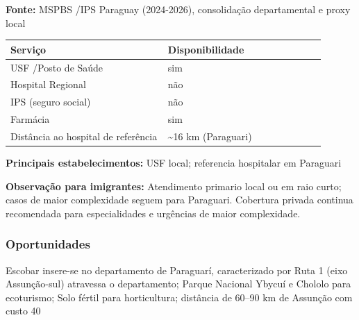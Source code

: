 \textbf{Fonte:} MSPBS /\allowbreak  IPS Paraguay (2024-2026), consolidação
departamental e proxy local

{\def\LTcaptype{none} %
\begin{longtable}{@{}>{\raggedright\arraybackslash}p{0.45\linewidth} >{\raggedright\arraybackslash}p{0.45\linewidth}@{}}
\toprule\noalign{}
Serviço & Disponibilidade \\
\midrule\noalign{}
\endhead
\bottomrule\noalign{}
\endlastfoot
USF /\allowbreak  Posto de Saúde & sim \\
Hospital Regional & não \\
IPS (seguro social) & não \\
Farmácia & sim \\
Distância ao hospital de referência & \textasciitilde16 km
(Paraguari) \\
\end{longtable}
}

\textbf{Principais estabelecimentos:} USF local; referencia hospitalar
em Paraguari

\textbf{Observação para imigrantes:} Atendimento primario local ou em
raio curto; casos de maior complexidade seguem para Paraguari. Cobertura
privada continua recomendada para especialidades e urgências de maior
complexidade.
\newpage

\subsubsection*{Oportunidades}\label{oport-escobar-0906}
Escobar insere-se no departamento de Paraguarí, caracterizado por Ruta 1 (eixo Assunção-sul) atravessa o departamento; Parque Nacional Ybycuí e Chololo para ecoturismo; Solo fértil para horticultura; distância de 60–90 km de Assunção com custo 40%

